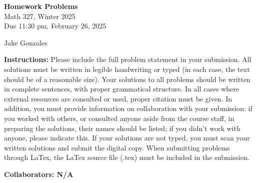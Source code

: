 \documentclass [10pt]{article}
\newcommand{\jg}[1]{{\color{blue} #1}}
\begin{document}
\begin{center}
{\bf Homework Problems}\\
Math 327, Winter 2025\\
Due 11:30 pm, February 26, 2025
\end{center}

\begin{center}
\jg{
    Jake Gonzales}
\end{center}

{\bf Instructions:} Please include the full problem statement in your submission.
All solutions must be written in legible handwriting
or typed (in each case, the text should be of a reasonable size). Your solutions to
all problems should be written in complete sentences, with proper grammatical
structure.
In all cases where external resources are consulted or used, proper citation must
be given. In addition,
you must provide information on collaboration with your submission: if you worked with others,
or consulted anyone aside from the course staff, in preparing the solutions, their
names should be
listed; if you didn't work with anyone, please indicate this.
If your solutions are not typed, you must scan your written solutions and submit
the digital copy. When submitting problems through LaTex, the LaTex source file
(.tex) must be included in the submission.

\jg{
\textbf{Collaborators: N/A }
}
\end{document}
